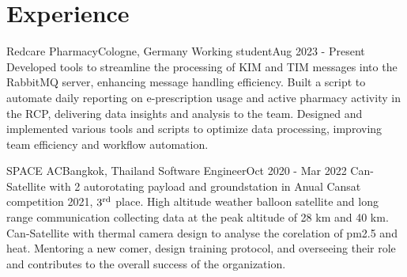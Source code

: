 \section{Experience}
\resumeSubHeadingListStart

\resumeSubheading
{Redcare Pharmacy}{Cologne, Germany}
{Working student}{Aug 2023 - Present}
\resumeItemListStart
{}
{Developed tools to streamline the processing of KIM and TIM messages into the RabbitMQ server, enhancing message handling efficiency.}
{Built a script to automate daily reporting on e-prescription usage and active pharmacy activity in the RCP, delivering data insights and analysis to the team.}
{Designed and implemented various tools and scripts to optimize data processing, improving team efficiency and workflow automation.}
\resumeItemListEnd

\resumeSubheading
{SPACE AC}{Bangkok, Thailand}
{Software Engineer}{Oct 2020 - Mar 2022}
\resumeItemListStart
{}
{Can-Satellite with 2 autorotating payload and groundstation in Anual Cansat competition 2021, $3\textsuperscript{rd}$ place.}
{High altitude weather balloon satellite and long range communication collecting data at the peak altitude of 28 km and 40 km.}
{Can-Satellite with thermal camera design to analyse the corelation of pm2.5 and heat.}
{Mentoring a new comer, design training protocol, and overseeing their role and contributes to the overall success of the organization.}
\resumeItemListEnd




\resumeSubHeadingListEnd

